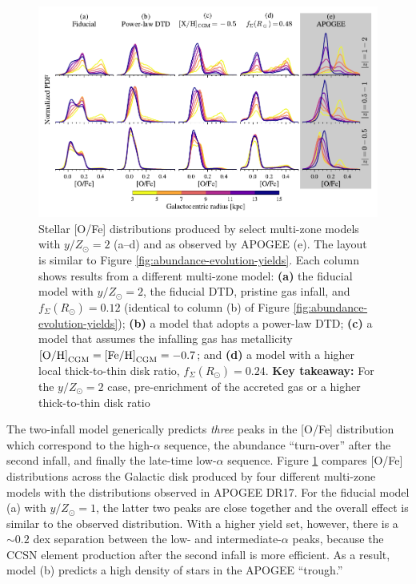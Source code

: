 \documentclass[twocolumn,twocolappendix,linenumbers]{aastex631}
\newcommand{\mathOH}{{\rm [O/H]}}
\newcommand{\mathFeH}{{\rm [Fe/H]}}
\newcommand{\yZ}[1]{$y/Z_\odot=#1$}
\begin{document}
\begin{figure}
    \centering
    \includegraphics[width=\linewidth]{src/tex/figures/ofe_distribution_params.pdf}
    \caption{Stellar [O/Fe] distributions produced by select multi-zone models with \yZ{2} (a--d) and as observed by APOGEE (e). The layout is similar to Figure \ref{fig:abundance-evolution-yields}. Each column shows results from a different multi-zone model: {\bf (a)} the fiducial model with \yZ{2}, the fiducial DTD, pristine gas infall, and $f_\Sigma(R_\odot)=0.12$ (identical to column (b) of Figure \ref{fig:abundance-evolution-yields}); {\bf (b)} a model that adopts a power-law DTD; {\bf (c)} a model that assumes the infalling gas has metallicity $\mathOH_{\rm CGM}=\mathFeH_{\rm CGM}=-0.7$; and {\bf (d)} a model with a higher local thick-to-thin disk ratio, $f_\Sigma(R_\odot)=0.24$. {\bf Key takeaway:} For the \yZ{2} case, pre-enrichment of the accreted gas or a higher thick-to-thin disk ratio}
    \label{fig:ofe-df}
\end{figure}

The two-infall model generically predicts {\it three} peaks in the [O/Fe] distribution which correspond to the high-$\alpha$ sequence, the abundance ``turn-over'' after the second infall, and finally the late-time low-$\alpha$ sequence. Figure \ref{fig:ofe-df} compares [O/Fe] distributions across the Galactic disk produced by four different multi-zone models with the distributions observed in APOGEE DR17. For the fiducial model (a) with $y/Z_\odot=1$, the latter two peaks are close together and the overall effect is similar to the observed distribution. With a higher yield set, however, there is a $\sim0.2$ dex separation between the low- and intermediate-$\alpha$ peaks, because the CCSN element production after the second infall is more efficient. As a result, model (b) predicts a high density of stars in the APOGEE ``trough.''
\end{document}
